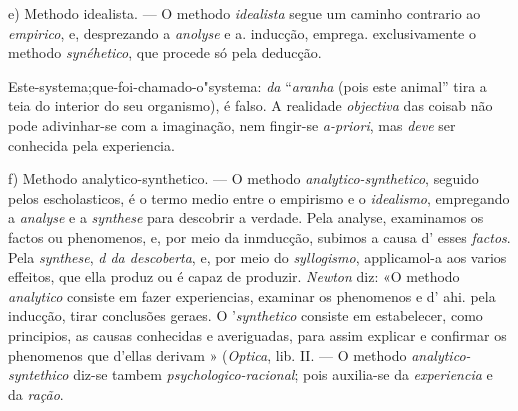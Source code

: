 e) Methodo idealista. --- O methodo \emph{idealista} segue um caminho contrario ao \emph{empirico}, e, desprezando a \emph{anolyse} e a. inducção, emprega. exclusivamente o methodo \emph{synéhetico}, que procede só pela deducção. \textbar{}

Este-systema;que-foi-chamado-o"systema: \emph{da} “\emph{aranha} (pois este animal” tira a teia do interior do seu organismo), é falso. A realidade \emph{objectiva} das coisab não pode adivinhar-se com a imaginação, nem fingir-se \emph{a-priori}, mas \emph{deve} ser conhecida pela experiencia.

f) Methodo analytico-synthetico. --- O methodo \emph{analytico-synthetico}, seguido pelos escholasticos, é o termo medio entre o empirismo e o \emph{idealismo}, empregando a \emph{analyse} e a \emph{synthese} para descobrir a verdade. Pela analyse, examinamos os factos ou phenomenos, e, por meio da inmducção, subimos a causa d' esses \emph{factos}. Pela \emph{synthese}, \emph{d da descoberta}, e, por meio do \emph{syllogismo}, applicamol-a aos varios effeitos, que ella produz ou é capaz de produzir. \emph{Newton} diz: «O methodo \emph{analytico} consiste em fazer experiencias, examinar os phenomenos e d' ahi. pela inducção, tirar conclusões geraes. O '\emph{synthetico} consiste em estabelecer, como principios, as causas conhecidas e averiguadas, para assim explicar e confirmar os phenomenos que d'ellas derivam » (\emph{Optica}, lib. II. --- O methodo \emph{analytico-syntethico} diz-se tambem \emph{psychologico-racional}; pois auxilia-se da \emph{experiencia} e da \emph{ração}.

